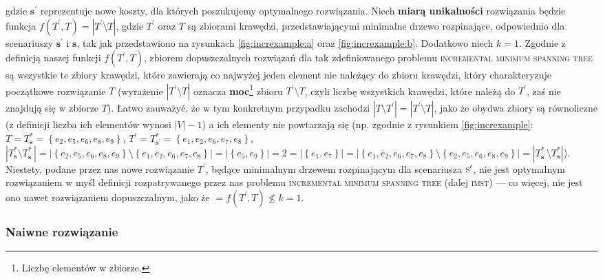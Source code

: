 gdzie $\textbf{s}^{\prime}$ reprezentuje nowe koszty, dla których poszukujemy optymalnego rozwiązania. Niech \textbf{miarą unikalności} rozwiązania będzie funkcja $f \left( T^{\prime}, T \right) = \left| T^{\prime} \setminus T \right|$, gdzie $T^{\prime}$ oraz $T$ są zbiorami krawędzi, przedstawiającymi minimalne drzewo rozpinające, odpowiednio dla scenariuszy $\textbf{s}^{\prime}$ i $\textbf{s}$, tak jak przedstawiono na rysunkach \ref{fig:increxample:a} oraz \ref{fig:increxample:b}. Dodatkowo niech $k = 1$. Zgodnie z definicją naszej funkcji $f \left( T^{\prime}, T \right)$, zbiorem dopuszczalnych rozwiązań dla tak zdefiniowanego problemu \textsc{incremental minimum spanning tree} są wszystkie te zbiory krawędzi, które zawierają co najwyżej jeden element nie należący do zbioru krawędzi, który charakteryzuje początkowe rozwiązanie $T$ (wyrażenie $\left| T^{\prime} \setminus T \right|$ oznacza \textbf{moc}\footnote{Liczbę elementów w zbiorze.} zbioru $T^{\prime} \setminus T$, czyli liczbę wszystkich krawędzi, które należą do $T^{\prime}$, zaś nie znajdują się w zbiorze $T$). Łatwo zauważyć, że w tym konkretnym przypadku zachodzi $\left| T \setminus T^{\prime} \right| = \left| T^{\prime} \setminus T \right|$, jako że obydwa zbiory są równoliczne (z definicji liczba ich elementów wynosi $\left| V \right| - 1$) a ich elementy nie powtarzają się (np. zgodnie z rysunkiem \ref{fig:increxample}: $T = T^{\ast}_{\textbf{s}} = \left\{ e_{2}, e_{5}, e_{6}, e_{8}, e_{9} \right\}$, $T^{\prime} = T^{\ast}_{\textbf{s}^{\prime}} = \left\{ e_{1}, e_{2}, e_{6}, e_{7}, e_{8} \right\}$, $\left| T^{\ast}_{\textbf{s}} \setminus T^{\ast}_{\textbf{s}^{\prime}} \right| = \left| \left\{ e_{2}, e_{5}, e_{6}, e_{8}, e_{9} \right\} \setminus \left\{ e_{1}, e_{2}, e_{6}, e_{7}, e_{8} \right\} \right| = \left| \left\{ e_{5}, e_{9} \right\} \right| = 2 = \left| \left\{ e_{1}, e_{7} \right\} \right| = \left| \left\{ e_{1}, e_{2}, e_{6}, e_{7}, e_{8} \right\} \setminus \left\{ e_{2}, e_{5}, e_{6}, e_{8}, e_{9} \right\} \right| = \left| T^{\ast}_{\textbf{s}^{\prime}} \setminus T^{\ast}_{\textbf{s}} \right|$). Niestety, podane przez nas nowe rozwiązanie $T^{\prime}$, będące minimalnym drzewem rozpinającym dla scenariusza $\textsc{s}^{\prime}$, nie jest optymalnym rozwiązaniem w myśl definicji rozpatrywanego przez nas problemu \textsc{incremental minimum spanning tree} (dalej \textsc{imst}) --- co więcej, nie jest ono nawet rozwiązaniem dopuszczalnym, jako że $ = f \left( T^{\prime}, T \right) \nleqslant k = 1$.

\subsubsection{Naiwne rozwiązanie}

